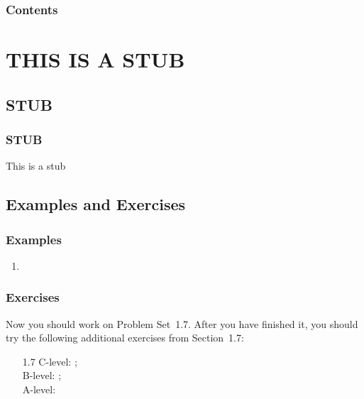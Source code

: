 \documentclass[serif,ignorenonframetext]{beamer}
\title{\commonTitleZeroOneSeven}
\subtitle{\commonSubtitleZeroOneSeven}
\author{\commonAuthor}
\institute{\commonInstitute}
\date{\commonDateZeroOneSeven}
\begin{document}

\begin{frame}
  \titlepage
\end{frame}

\begin{frame}
  \frametitle{Contents}
  \tableofcontents
\end{frame}

\section{THIS IS A STUB}

\subsection{STUB}

\begin{frame}
  \frametitle{STUB}
  This is a stub
\end{frame}


\subsection{Examples and Exercises}

\begin{frame}
  \frametitle{Examples}
  \begin{enumerate}
  \item 
  \end{enumerate} 
\end{frame}

\begin{frame}
  \frametitle{Exercises}
  Now you should work on Problem Set~1.7.  After you have finished it,
  you should try the following additional exercises from Section~1.7:
  \begin{itemize}
  \item[1.7] C-level: ; \\
    B-level: ; \\
    A-level: 
  \end{itemize}
\end{frame}
\end{document}
